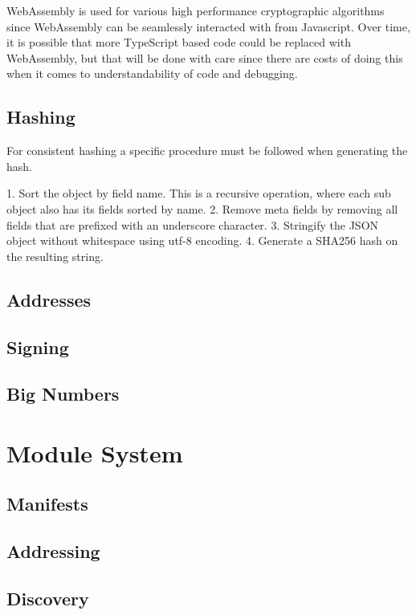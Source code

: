 \documentclass{article}
\begin{document}
WebAssembly is used for various high performance cryptographic algorithms since WebAssembly can be seamlessly interacted with from Javascript.  Over time, it is possible that more TypeScript based code could be replaced with WebAssembly, but that will be done with care since there are costs of doing this when it comes to understandability of code and debugging.

\subsection{Hashing}
For consistent hashing a specific procedure must be followed when generating the hash.

1. Sort the object by field name.  This is a recursive operation, where each sub object also has its fields sorted by name.
2. Remove meta fields by removing all fields that are prefixed with an underscore character.
3. Stringify the JSON object without whitespace using utf-8 encoding.
4. Generate a SHA256 hash on the resulting string.

\subsection{Addresses}

\subsection{Signing}

\subsection{Big Numbers}

\section{Module System}

\subsection{Manifests}

\subsection{Addressing}

\subsection{Discovery}
\end{document}
